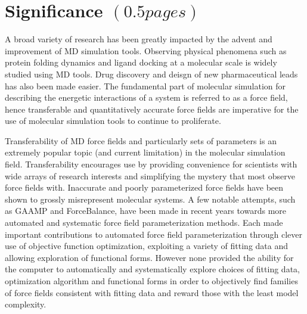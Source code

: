 \documentclass[rmp,nofootinbib,superscriptaddress,12pt,tightenlines,notitlepage]{revtex4-1}
\begin{document}
\section{Significance $\left(0.5 pages\right)$}
A broad variety of research has been greatly impacted by the advent and improvement of MD simulation tools. Observing physical phenomena such as protein folding dynamics and ligand docking at a molecular scale is widely studied using MD tools.\cite{villin} Drug discovery and deisgn of new pharmaceutical leads has also been made easier.\cite{drug_discov} The fundamental part of molecular simulation for describing the energetic interactions of a system is referred to as a force field, hence transferable and quantitatively accurate force fields are imperative for the use of molecular simulation tools to continue to proliferate.

Transferability of MD force fields and particularly sets of parameters is an extremely popular topic (and current limitation) in the molecular simulation field.\cite{transferability1,transferability2,transferability3,transferability4} Transferability encourages use by providing convenience for scientists with wide arrays of research interests and simplifying the mystery that most observe force fields with. Inaccurate and poorly parameterized force fields have been shown to grossly misrepresent molecular systems.\cite{ffcomp1,ffcomp2} A few notable attempts, such as GAAMP and ForceBalance, have been made in recent years towards more automated and systematic force field parameterization methods.\cite{GAAMP,FB1,FB2,FB3} Each made important contributions to automated force field parameterization through clever use of objective function optimization, exploiting a variety of fitting data and allowing exploration of functional forms. However none provided the ability for the computer to automatically and systematically explore choices of fitting data, optimization algorithm and functional forms in order to objectively find families of force fields consistent with fitting data and reward those with the least model complexity.
\end{document}
